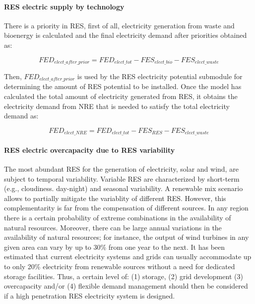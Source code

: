 \paragraph{RES electric supply by technology}

There is a priority in RES, first of all, electricity generation from waste and bioenergy is calculated and the final electricity demand after priorities obtained as:

\begin{equation}
    FED_{elect\_after\_prior}= FED_{elect\_tot}-FES_{elect\_bio}-FES_{elect\_waste}
    \label{eq:FED-after-priorities}
\end{equation}

Then, $FED_{elect\_after\_prior}$ is used by the RES electricity potential submodule for determining the amount of RES potential to be installed.
Once the model has calculated the total amount of electricity generated from RES, it obtains the electricity demand from NRE that is needed to satisfy the total electricity demand as:

\begin{equation}
    FED_{elect\_NRE}= FED_{elect\_tot}-FES_{RES}-FES_{elect\_waste}
    \label{eq:FED-elect-NRE}
\end{equation}


\paragraph{RES electric overcapacity due to RES variability}

The most abundant RES for the generation of electricity, solar and wind, are subject to temporal variability. Variable RES are characterized by short-term (e.g., cloudiness. day-night) and seasonal variability. A renewable mix scenario allows to partially mitigate the variablity of different RES. However, this complementarity is far from the compensation of different sources. In any region there is a certain probability of extreme combinations in the availability of natural resources. Moreover, there can be large annual variations in the availability of natural resources; for instance, the output of wind turbines in any given area can vary by up to 30\% from one year to the next.  It has been estimated that current electricity systems and grids can usually accommodate up to only 20\% electricity from renewable sources without a need for dedicated storage facilities. Thus, a certain level of: (1) storage, (2) grid development (3) overcapacity and/or (4) flexible demand management should then be considered if a high penetration RES electricity system is designed.


